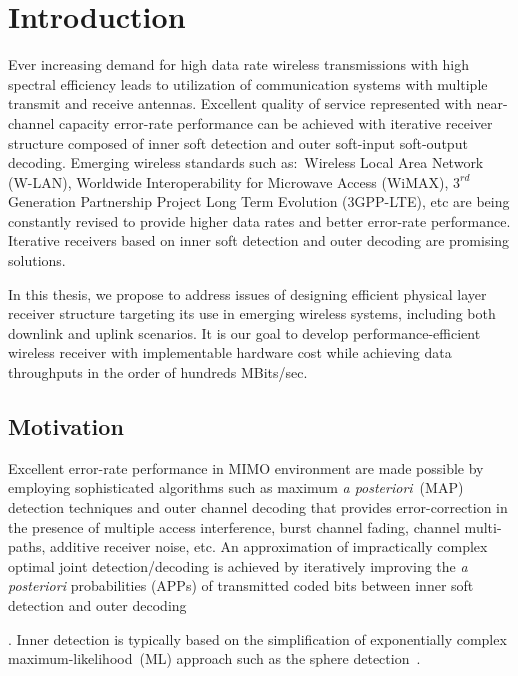 \chapter{Introduction}
\label{ch:Intro}
Ever increasing demand for high data rate wireless transmissions with high spectral efficiency leads to utilization of communication systems with multiple transmit and receive antennas. Excellent quality of service represented with near-channel capacity error-rate performance can be achieved with iterative receiver structure composed of inner soft detection and outer soft-input soft-output decoding. Emerging wireless standards such as:~Wireless Local Area Network (W-LAN), Worldwide Interoperability for Microwave Access (WiMAX), $3^{rd}$ Generation Partnership Project Long Term Evolution (3GPP-LTE), etc are being constantly revised to provide higher data rates and better error-rate performance. Iterative receivers based on inner soft detection and outer decoding are promising solutions.

In this thesis, we propose to address issues of designing efficient physical layer receiver structure targeting its use in emerging wireless systems, including both downlink and uplink scenarios. It is our goal to develop performance-efficient wireless receiver with implementable hardware cost while achieving data throughputs in the order of hundreds MBits/sec. 

\section{Motivation}
\label{sec:Motivation}
Excellent error-rate performance in MIMO environment are made possible by employing sophisticated algorithms such as maximum \emph{a posteriori}~(MAP) detection techniques and outer channel decoding that provides error-correction in the presence of multiple access interference, burst channel fading, channel multi-paths, additive receiver noise, etc. An approximation of impractically complex optimal joint detection/decoding is achieved by iteratively improving the \emph{a posteriori} probabilities (APPs) of transmitted coded bits between inner soft detection and outer decoding \cite{rubin1987}

. Inner detection is typically based on the simplification of exponentially complex maximum-likelihood~(ML) approach such as the sphere detection~\cite{van2012flexible}. 
